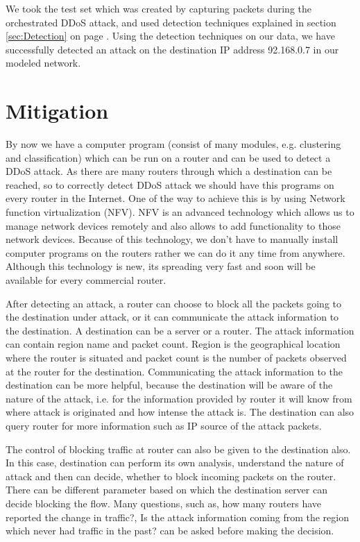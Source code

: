 \documentclass[12pt,oneside,a4paper]{article}
\begin{document}
We took the test set which was created by capturing packets during the orchestrated DDoS attack, and used detection techniques explained in section \ref{sec:Detection} on page \pageref{sec:Detection}. Using the detection techniques on our data, we have successfully detected an attack on the destination IP address 92.168.0.7 in our modeled network.

\section{Mitigation}

By now we have a computer program (consist of many modules, e.g. clustering and classification) which can be run on a router and can be used to detect a DDoS attack. As there are many routers through which a destination can be reached, so to correctly detect DDoS attack we should have this programs on every router in the Internet. One of the way to achieve this is by using Network function virtualization (NFV)\cite{nfv}. NFV is an advanced technology which allows us to manage network devices remotely and also allows to add functionality to those network devices. Because of this technology, we don't have to manually install computer programs on the routers rather we can do it any time from anywhere. Although this technology is new, its spreading very fast and soon will be available for every commercial router.

After detecting an attack, a router can choose to block all the packets going to the destination under attack, or it can communicate the attack information to the destination. A destination can be a server or a router. The attack information can contain region name and packet count. Region is the geographical location where the router is situated and packet count is the number of packets observed at the router for the destination. Communicating the attack information to the destination can be more helpful, because the destination will be aware of the nature of the attack, i.e. for the information provided by router it will know from where attack is originated and how intense the attack is. The destination can also query router for more information such as IP source of the attack packets.

The control of blocking traffic at router can also be given to the destination also. In this case, destination can perform its own analysis, understand the nature of attack and then can decide, whether to block incoming packets on the router. There can be different parameter based on which the destination server can decide blocking the flow. Many questions, such as, how many routers have reported the change in traffic?, Is the attack information coming from the region which never had traffic in the past? can be asked before making the decision.
\end{document}
